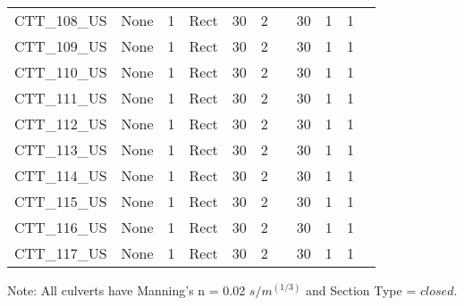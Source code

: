 \begin{table}[]
\begin{tabular}{@{}lcccccccccc@{}}
CTT\_108\_US  & None       & 1        & Rect & 30     & 2     &          & 30     & 1         & 1          \\
CTT\_109\_US  & None       & 1        & Rect & 30     & 2     &          & 30     & 1         & 1          \\
CTT\_110\_US  & None       & 1        & Rect & 30     & 2     &          & 30     & 1         & 1          \\
CTT\_111\_US  & None       & 1        & Rect & 30     & 2     &          & 30     & 1         & 1          \\
CTT\_112\_US  & None       & 1        & Rect & 30     & 2     &          & 30     & 1         & 1          \\
CTT\_113\_US  & None       & 1        & Rect & 30     & 2      &          & 30     & 1         & 1          \\
CTT\_114\_US  & None       & 1        & Rect & 30     & 2      &          & 30     & 1         & 1          \\
CTT\_115\_US  & None       & 1        & Rect & 30     & 2      &          & 30     & 1         & 1          \\
CTT\_116\_US  & None       & 1        & Rect & 30     & 2      &          & 30     & 1         & 1          \\
CTT\_117\_US  & None       & 1        & Rect & 30     & 2      &          & 30     & 1         & 1          \\
\bottomrule
\end{tabular}

Note: All culverts have Manning's n = 0.02 $s/m^{(1/3)}$ and Section Type = $closed$.
\end{table}
\clearpage


